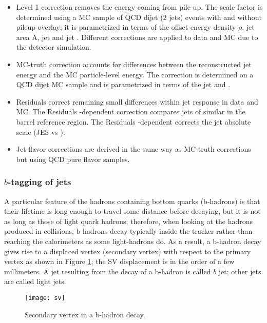 \begin{itemize}
\item Level 1 correction removes the energy coming from pile-up. The scale factor is determined using a MC sample of QCD dijet (2 jets) events with and without pileup overlay; it is parametrized in terms of the offset energy density $\rho$, jet area A, jet \etac and jet \pt. Different corrections are applied to data and MC due to the detector simulation.
\item MC-truth correction accounts for differences between the reconstructed jet energy and the MC particle-level energy. The correction is determined on a QCD dijet MC sample and is parametrized in terms of the jet \pt and \etac.
\item Residuals correct remaining small differences within jet response in data and MC. The Residuals \etac-dependent correction compares jets of similar \pt in the barrel reference region. The Residuals \pt-dependent corrects the jet absolute scale (JES vs \pt).
\item Jet-flavor corrections are derived in the same way as MC-truth corrections but using QCD pure flavor samples. 
\end{itemize}  

\subsubsection*{$b$-tagging of jets}

A particular feature of the hadrons containing bottom quarks (b-hadrons) is that their lifetime is long enough to travel some distance before decaying, but it is not as long as those of light quark hadrons; therefore, when looking at the hadrons produced in \pp collisions, b-hadrons decay typically inside the tracker rather than reaching the calorimeters as some light-hadrons do. As a result, a b-hadron decay gives rise to a displaced vertex (secondary vertex) with respect to the primary vertex as shown in Figure \ref{fig:sv}; the SV displacement is in the order of a few millimeters. A jet resulting from the decay of a b-hadron is called $b$ jet; other jets are called light jets.\\ 

\begin{figure}[!h]
  \centering
  \texttt{[image: sv]}
  \caption[Secondary vertex in a b-hadron decay.]{Secondary vertex in a b-hadron decay.}\label{fig:sv}
\end{figure}

